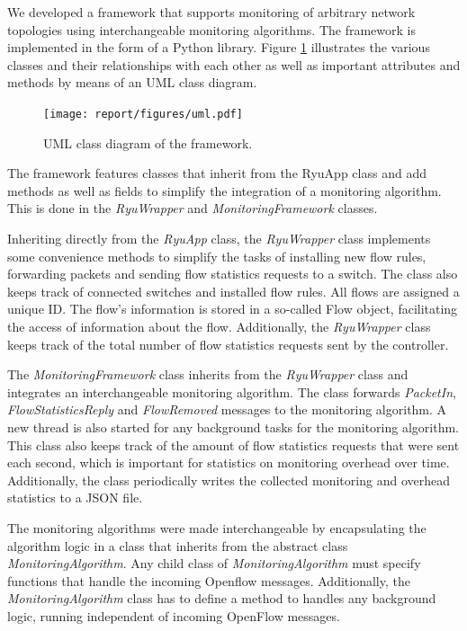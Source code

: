 \documentclass[DIV=12]{scrartcl}
\begin{document}
We developed a framework that supports monitoring of arbitrary network topologies using interchangeable monitoring algorithms.
The framework is implemented in the form of a Python library.
Figure \ref{fig:uml} illustrates the various classes and their relationships with each other as well as important attributes and methods by means of an UML class diagram.

\begin{figure}[]
  \centering
  \texttt{[image: report/figures/uml.pdf]}
  \caption{UML class diagram of the framework.}
  \label{fig:uml}
\end{figure}

The framework features classes that
inherit from the RyuApp class and add methods as well as fields to simplify the
integration of a monitoring algorithm. This is done in the \textit{RyuWrapper} and
\textit{MonitoringFramework} classes.

Inheriting directly from the \textit{RyuApp} class, the \textit{RyuWrapper} class implements some convenience methods to simplify the tasks of installing new flow rules, forwarding packets and sending flow statistics requests to a switch.
The class also keeps track of connected switches and installed flow rules. All flows are assigned a unique ID. The flow's information is stored
in a so-called Flow object, facilitating the access of information about the flow.
Additionally, the \textit{RyuWrapper} class keeps track of the total number of flow statistics requests sent by the controller.

The \textit{MonitoringFramework} class inherits from the \textit{RyuWrapper} class and integrates an interchangeable monitoring algorithm. The class forwards
\textit{PacketIn}, \textit{FlowStatisticsReply} and \textit{FlowRemoved} messages to the monitoring algorithm. A new thread is also started for any background tasks for the monitoring algorithm. This class also keeps track of the amount of flow statistics requests that were sent each second, which is important for statistics on monitoring overhead over time. Additionally, the class periodically writes the collected monitoring and overhead statistics to a JSON file.

The monitoring algorithms were made interchangeable by encapsulating the algorithm logic in a class that inherits from the abstract class \textit{MonitoringAlgorithm}. Any child class of \textit{MonitoringAlgorithm}
must specify functions that handle the incoming Openflow messages.
Additionally, the \textit{MonitoringAlgorithm} class has to define a method to handles any background logic, running independent of incoming OpenFlow messages.
\end{document}
